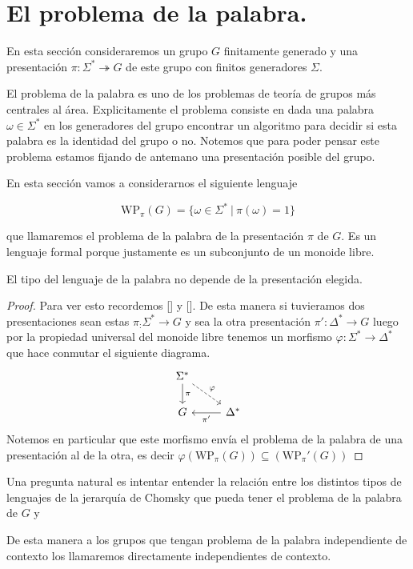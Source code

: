 \documentclass[tesis.tex]{subfiles}
\begin{document}
	
\section{El problema de la palabra.}
En esta sección consideraremos un grupo $G$ finitamente generado y una presentación $\pi: \Sigma^* \twoheadrightarrow  G$ de este grupo con finitos generadores $\Sigma$. 

El problema de la palabra es uno de los problemas de teoría de grupos más centrales al área. Explicitamente el problema consiste en dada una palabra $\omega \in \Sigma^*$ en los generadores del grupo encontrar un algoritmo para decidir si esta palabra es la identidad del grupo o no. Notemos que para poder pensar este problema estamos fijando de antemano una presentación posible del grupo.

En esta sección vamos a considerarnos el siguiente lenguaje 

$$\text{WP}_\pi (G) = \{ \omega \in \Sigma^* \ | \ \pi(\omega)=1 \}$$

que llamaremos el problema de la palabra de la presentación $\pi$ de $G$. Es un lenguaje formal porque justamente es un subconjunto de un monoide libre.

\begin{obs}
	El tipo del lenguaje de la palabra no depende de la presentación elegida.
\end{obs}
\begin{proof}
	Para ver esto recordemos [] y []. De esta manera si tuvieramos dos presentaciones sean estas
$\pi_:\Sigma^* \to G$ y sea la otra presentación $\pi': \Delta^* \to G$	luego por la propiedad universal del monoide libre tenemos un morfismo $\varphi:\Sigma^* \to \Delta^*$ que hace conmutar el siguiente diagrama. 
	\[
	\begin{tikzcd}
	\Sigma^*  \arrow{d}{\pi}  \arrow[dashrightarrow]{dr}{\varphi}   \\
	G     &  \Delta^* \arrow{l}{\pi'}
	\end{tikzcd}
	\]
Notemos en particular que este morfismo envía el problema de la palabra de una presentación al de la otra, es decir $\varphi(\text{WP}_\pi (G)) \subseteq (\text{WP}_\pi' (G))$
\end{proof}

Una pregunta natural es intentar entender la relación entre los distintos tipos de lenguajes de la jerarquía de Chomsky que pueda tener el problema de la palabra de $G$ y

De esta manera a los grupos que tengan problema de la palabra independiente de contexto los llamaremos directamente independientes de contexto.
\end{document}
